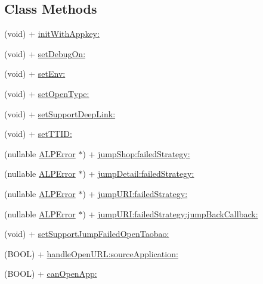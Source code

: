 \subsection*{Class Methods}
\begin{DoxyCompactItemize}
\item 
(void) + \mbox{\hyperlink{interface_a_l_p_t_b_link_partner_s_d_k_ae0e3f4df25ea40bba08bc3588c39888d}{init\+With\+Appkey\+:}}
\item 
(void) + \mbox{\hyperlink{interface_a_l_p_t_b_link_partner_s_d_k_aeea8fe76bb2c767aa72a54dc0141e78f}{set\+Debug\+On\+:}}
\item 
(void) + \mbox{\hyperlink{interface_a_l_p_t_b_link_partner_s_d_k_af3dcd26617de9790bb4e6f76217db26d}{set\+Env\+:}}
\item 
(void) + \mbox{\hyperlink{interface_a_l_p_t_b_link_partner_s_d_k_a4461a7b64cbff06164da5991cda19c3f}{set\+Open\+Type\+:}}
\item 
(void) + \mbox{\hyperlink{interface_a_l_p_t_b_link_partner_s_d_k_a2a2c36c7f060673309257f123bb31327}{set\+Support\+Deep\+Link\+:}}
\item 
(void) + \mbox{\hyperlink{interface_a_l_p_t_b_link_partner_s_d_k_a4ab65c468f9f7dc95ff4189034b56992}{set\+T\+T\+I\+D\+:}}
\item 
(nullable \mbox{\hyperlink{interface_a_l_p_error}{A\+L\+P\+Error}} $\ast$) + \mbox{\hyperlink{interface_a_l_p_t_b_link_partner_s_d_k_ad5c0623b62fb3f52dc6f73a0523036a2}{jump\+Shop\+:failed\+Strategy\+:}}
\item 
(nullable \mbox{\hyperlink{interface_a_l_p_error}{A\+L\+P\+Error}} $\ast$) + \mbox{\hyperlink{interface_a_l_p_t_b_link_partner_s_d_k_a91df05ce1cb2da4651b3d38f7bf3b6ec}{jump\+Detail\+:failed\+Strategy\+:}}
\item 
(nullable \mbox{\hyperlink{interface_a_l_p_error}{A\+L\+P\+Error}} $\ast$) + \mbox{\hyperlink{interface_a_l_p_t_b_link_partner_s_d_k_aa104ffde1663fbf4c88d6fddd705ddf6}{jump\+U\+R\+I\+:failed\+Strategy\+:}}
\item 
(nullable \mbox{\hyperlink{interface_a_l_p_error}{A\+L\+P\+Error}} $\ast$) + \mbox{\hyperlink{interface_a_l_p_t_b_link_partner_s_d_k_a64ed79c245f34bf158de3ca83630a138}{jump\+U\+R\+I\+:failed\+Strategy\+:jump\+Back\+Callback\+:}}
\item 
(void) + \mbox{\hyperlink{interface_a_l_p_t_b_link_partner_s_d_k_af26754e9b04c6111da401e2923127686}{set\+Support\+Jump\+Failed\+Open\+Taobao\+:}}
\item 
(B\+O\+OL) + \mbox{\hyperlink{interface_a_l_p_t_b_link_partner_s_d_k_a59567d237a2c01c60e8bcd0a26c7c9a9}{handle\+Open\+U\+R\+L\+:source\+Application\+:}}
\item 
(B\+O\+OL) + \mbox{\hyperlink{interface_a_l_p_t_b_link_partner_s_d_k_a986d89d683a8286fc6ca072a930052f4}{can\+Open\+App\+:}}
\end{DoxyCompactItemize}


